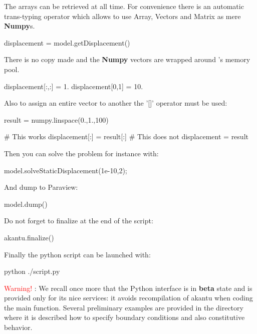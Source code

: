 The \akantu arrays can be retrieved at all time. For convenience there
is an automatic trans-typing operator which allows to use \akantu
Array, Vectors and Matrix as mere \textbf{Numpy}s.

\begin{python}
  displacement = model.getDisplacement()
\end{python}

There is no copy made and the \textbf{Numpy} vectors are wrapped
around \akantu's memory pool.

\begin{python}
  displacement[:,:] = 1.
  displacement[0,1] = 10.
\end{python}

Also to assign an entire vector to another the '[]' operator must be
used:

\begin{python}
  result = numpy.linspace(0.,1.,100)

  # This works
  displacement[:] = result[:]
  # This does not
  displacement = result
\end{python}

Then you can solve the problem for instance with:
\begin{python}
  model.solveStaticDisplacement(1e-10,2);
\end{python}
And dump to Paraview:
\begin{python}
  model.dump()
\end{python}

Do not forget to finalize at the end of the script:
\begin{python}
  akantu.finalize()
\end{python}

Finally the python script can be launched with:
\begin{command}
  python ./script.py
\end{command}

\vspace{1cm}

\textcolor{red}{Warning!} : We recall once more that the Python
interface is in \textbf{beta} state and is provided only for its nice
services: it avoids recompilation of akantu when coding the main function.
Several preliminary examples are provided
in the  directory where it is described how to specify
boundary conditions and also constitutive behavior.
